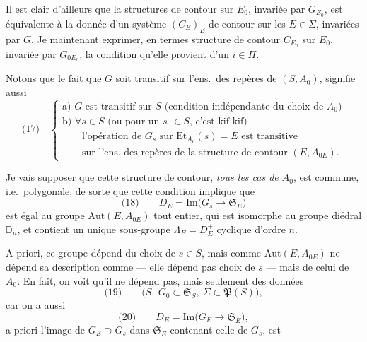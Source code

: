 \documentclass[11pt,a4paper]{article}
\begin{document}
Il est clair d'ailleurs que la   structures
de contour sur $E_0$, invariée par $G_{E_0}$, est équivalente à la donnée d'un
système  $(C_E)_E$ de contour sur les $E \in \Sigma$,
invariées par $G$. Je  maintenant exprimer, en termes
  structure de contour $C_{E_0}$ sur $E_0$, invariée
par $G_{0E_0}$, la condition qu'elle provient d'un $i \in \Pi$.

Notons que le fait que $G$ soit transitif sur l'ens.\ des repères de
$(S, A_0)$, signifie aussi 
\[
\text{(17)}\quad
\begin{cases}
\text{a) } G \text{ est transitif sur } S \text{ (condition indépendante du choix de } A_0)\\
\text{b) } \forall s \in S \text{ (ou pour un } s_0 \in S \text{, c'est kif-kif)}\\
\qquad \text{l'opération de } G_s \text{ sur } \mathrm{Et}_{A_0}(s) = E \text{ est transitive}\\
\qquad \text{sur l'ens. des repères de la structure de contour } (E, A_{0E}) .
\end{cases}
\]

Je vais supposer que cette structure de contour,  
 \emph{tous les cas de $A_0$}, est commune, i.e.\ polygonale,
de sorte que cette condition implique que
\[
\text{(18)} \qquad D_E = \mathrm{Im}\bigl( G_s \longrightarrow \mathfrak{S}_E \bigr)
\]
est égal au groupe $\mathrm{Aut}(E, A_{0E})$ tout entier, qui est isomorphe au
groupe diédral $\mathbb{D}_n$, et contient un unique sous-groupe
$\Lambda_E = D_E^{+}$ cyclique d'ordre $n$.

A priori,  ce groupe dépend du choix de $s \in S$,
mais comme $\mathrm{Aut}(E, A_{0E})$ ne dépend  sa description
comme \ill{} — elle dépend pas  choix de $s$ — mais de celui de
$A_0$. En fait, on voit qu'il ne dépend pas, mais seulement des données
\[
\text{(19)} \qquad \bigl( S ,\ G_0 \subset \mathfrak{S}_S ,\ \Sigma \subset \mathfrak{P}(S) \bigr) ,
\]
car on a aussi
\[
\text{(20)} \qquad D_E = \mathrm{Im}\bigl( G_E \longrightarrow \mathfrak{S}_E \bigr) ,
\]
a priori l'image de $G_E \supset G_s$ dans
$\mathfrak{S}_E$ contenant celle de $G_s$, est 
\struck{\ill{}}
\end{document}
